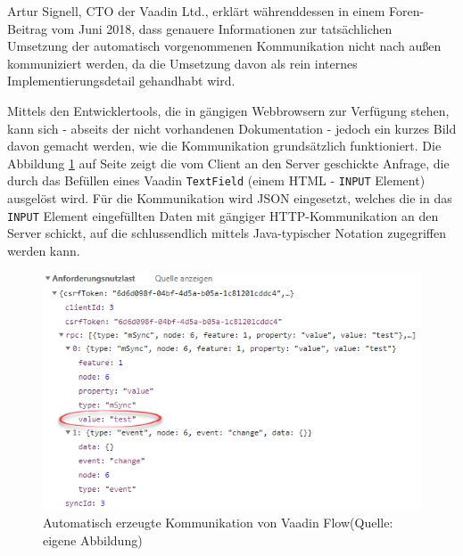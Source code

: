 \documentclass[a4paper,12pt,twoside]{scrreprt}
\begin{document}
\medskip

Artur Signell, CTO der Vaadin Ltd., erklärt währenddessen in einem Foren-Beitrag vom Juni 2018, dass genauere Informationen zur tatsächlichen Umsetzung der automatisch vorgenommenen Kommunikation nicht nach außen kommuniziert werden, da die Umsetzung davon als rein internes Implementierungsdetail gehandhabt wird. \parencite[][]{signell_explanation_2018}

\medskip

Mittels den Entwicklertools, die in gängigen Webbrowsern zur Verfügung stehen, kann sich - abseits der nicht vorhandenen Dokumentation - jedoch ein kurzes Bild davon gemacht werden, wie die Kommunikation grundsätzlich funktioniert. Die Abbildung \ref{fig:vaadin-json-communication} auf Seite \pageref{fig:vaadin-json-communication} zeigt die vom Client an den Server geschickte Anfrage, die durch das Befüllen eines Vaadin \texttt{TextField} (einem HTML - \texttt{INPUT} Element) ausgelöst wird. Für die Kommunikation wird \acs{JSON} eingesetzt, welches die in das \texttt{INPUT} Element eingefüllten Daten mit gängiger HTTP-Kommunikation an den Server schickt, auf die schlussendlich mittels Java-typischer Notation zugegriffen werden kann.

\begin{figure}[ht]
    \centering
    \includegraphics[scale=0.75]{images/Luidold_Vaadin-HTTP-communication.png}
    \caption[Automatisch erzeugte Kommunikation von Vaadin Flow]{Automatisch erzeugte Kommunikation von Vaadin Flow\newline(Quelle: eigene Abbildung)}
    \label{fig:vaadin-json-communication}
\end{figure}

\newpage
\end{document}
